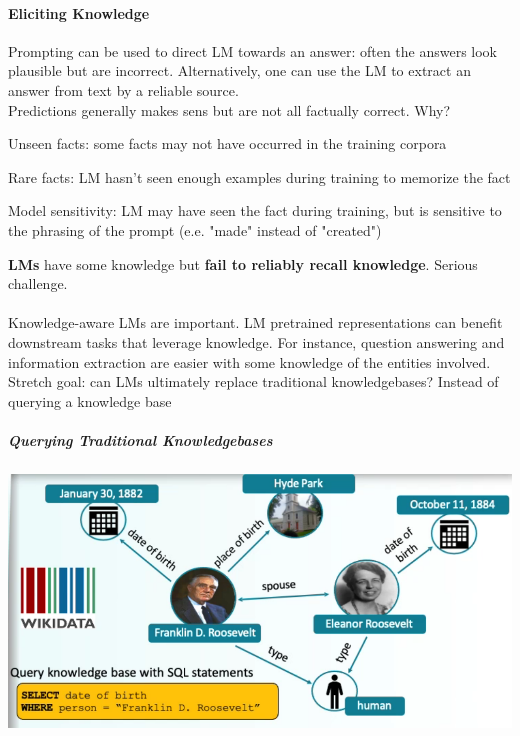 \documentclass[10pt]{report}
\begin{document}
\paragraph{Eliciting Knowledge} Prompting can be used to direct LM towards an answer: often the answers look plausible but are incorrect. Alternatively, one can use the LM to extract an answer from text by a reliable source.\\
Predictions generally makes sens but are not all factually correct. Why?\begin{list}{}{}
	\item Unseen facts: some facts may not have occurred in the training corpora
	\item Rare facts: LM hasn't seen enough examples during training to memorize the fact
	\item Model sensitivity: LM may have seen the fact during training, but is sensitive to the phrasing of the prompt (e.e. "made" instead of "created")
\end{list}
\textbf{LMs} have some knowledge but \textbf{fail to reliably recall knowledge}. Serious challenge.\\\\
Knowledge-aware LMs are important. LM pretrained representations can benefit downstream tasks that leverage knowledge. For instance, question answering and information extraction are easier with some knowledge of the entities involved. Stretch goal: can LMs ultimately replace traditional knowledgebases? Instead of querying a knowledge base %
\subparagraph{Querying Traditional Knowledgebases}
\begin{center}
	\includegraphics[scale=0.5]{104.png}
\end{center}
\end{document}
